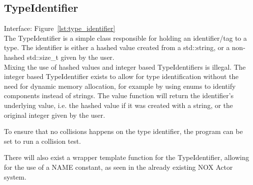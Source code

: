 \subsection{TypeIdentifier}
Interface: Figure~\ref{lst:type_identifier}\\\noindent
The TypeIdentifier is a simple class responsible for holding an identifier/tag to a type. 
The identifier is either a hashed value created from a std::string, or a non-hashed std::size\_t given by the user.\\
Mixing the use of hashed values and integer based TypeIdentifiers is illegal. 
The integer based TypeIdentifier exists to allow for type identification without the need for dynamic
memory allocation, for example by using enums to identify components instead of strings.
The value function will return the identifier's underlying value, i.e. the hashed value if it was created with a string, 
or the original integer given by the user.

To ensure that no collisions happens on the type identifier, the program can be set to run a collision test.

There will also exist a wrapper template function for the TypeIdentifier, allowing for the use of a NAME constant, as seen in the already existing NOX Actor system.
